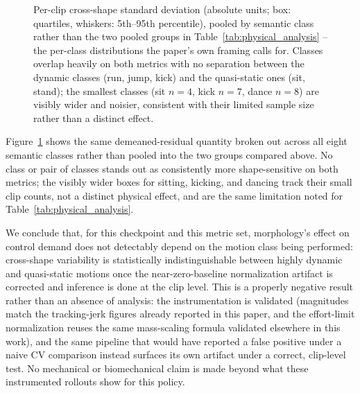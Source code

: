 \begin{figure}[t]
\caption{Per-clip cross-shape standard deviation (absolute units; box:
quartiles, whiskers: 5th--95th percentile), pooled by semantic class rather
than the two pooled groups in Table~\ref{tab:physical_analysis} -- the
per-class distributions the paper's own framing calls for. Classes overlap
heavily on both metrics with no separation between the dynamic classes
(run, jump, kick) and the quasi-static ones (sit, stand); the smallest
classes (sit $n{=}4$, kick $n{=}7$, dance $n{=}8$) are visibly wider and
noisier, consistent with their limited sample size rather than a distinct
effect.}\label{fig:physical_per_class}
\end{figure}

Figure~\ref{fig:physical_per_class} shows the same demeaned-residual
quantity broken out across all eight semantic classes rather than pooled
into the two groups compared above. No class or pair of classes stands out
as consistently more shape-sensitive on both metrics; the visibly wider
boxes for sitting, kicking, and dancing track their small clip counts, not a
distinct physical effect, and are the same limitation noted for
Table~\ref{tab:physical_analysis}.

We conclude that, for this checkpoint and this metric set, morphology's
effect on control demand does not detectably depend on the motion class
being performed: cross-shape variability is statistically indistinguishable
between highly dynamic and quasi-static motions once the near-zero-baseline
normalization artifact is corrected and inference is done at the clip
level. This is a properly negative result rather than an absence of
analysis: the instrumentation is validated (magnitudes match the
tracking-jerk figures already reported in this paper, and the effort-limit
normalization reuses the same mass-scaling formula validated elsewhere in
this work), and the same pipeline that would have reported a false positive
under a naive CV comparison instead surfaces its own artifact under a
correct, clip-level test. No mechanical or biomechanical claim is made
beyond what these instrumented rollouts show for this policy.
